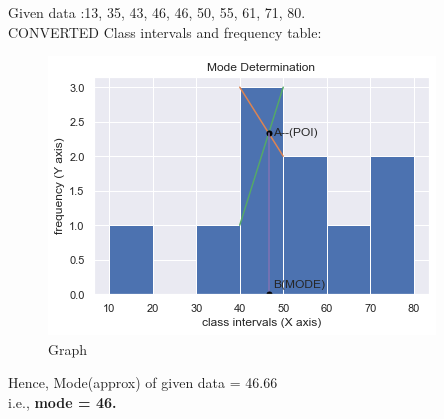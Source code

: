 \documentclass[journal,12pt,twocolumn]{IEEEtran}
\begin{document}
Given data :13, 35, 43, 46, 46, 50, 55, 61, 71, 80.\\ [12pt]
CONVERTED Class intervals and frequency table:\\[16pt]

\begin{table}[h]
    \centering
	
    \caption{}
    \label{TABLE}
\end{table}
\begin{figure}
	\centering
	\includegraphics[scale=0.8]{graph.png}
	\caption{Graph}
\end{figure}	
Hence, Mode(approx) of given data = 46.66\\
i.e., \textbf{mode = 46.}\\
\end{document}
